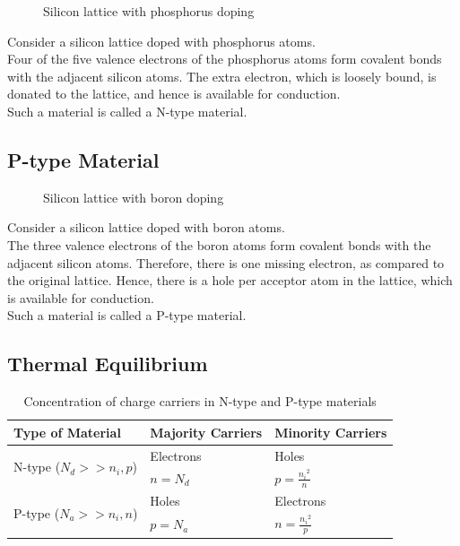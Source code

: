 \documentclass[titlepage, fleqn, a4paper, 12pt, twoside]{article}
\theoremstyle{definition}
\theoremstyle{theorem}
\let\Oldsubsection\subsection
\renewcommand{\subsection}{\FloatBarrier\Oldsubsection}
\begin{document}
\begin{figure}[h]
	\centering
	\caption{Silicon lattice with phosphorus doping}
\end{figure}

Consider a silicon lattice doped with phosphorus atoms.\\
Four of the five valence electrons of the phosphorus atoms form covalent bonds with the adjacent silicon atoms.
The extra electron, which is loosely bound, is donated to the lattice, and hence is available for conduction.\\
Such a material is called a N-type material.

\subsection{P-type Material}

\begin{figure}[h]
	\centering
	\caption{Silicon lattice with boron doping}
\end{figure}

Consider a silicon lattice doped with boron atoms.\\
The three valence electrons of the boron atoms form covalent bonds with the adjacent silicon atoms.
Therefore, there is one missing electron, as compared to the original lattice.
Hence, there is a hole per acceptor atom in the lattice, which is available for conduction.\\
Such a material is called a P-type material.

\subsection{Thermal Equilibrium}

\begin{table}[H]
	\centering
	\begin{tabular}{l l l}
		\toprule
		Type of Material & Majority Carriers & Minority Carriers\\
		\midrule
		\multirow{2}{*}{N-type ($N_d >> n_i,p$)} & Electrons & Holes\\
		& $n = N_d$ & $p = \frac{{n_i}^2}{n}$\\
		\midrule
		\multirow{2}{*}{P-type ($N_a >> n_i,n$)} & Holes & Electrons\\
		& $p = N_a$ & $n = \frac{{n_i}^2}{p}$\\
		\bottomrule
	\end{tabular}
	\caption{Concentration of charge carriers in N-type and P-type materials}
\end{table}
\end{document}

